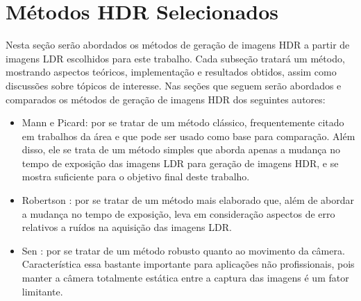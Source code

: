 \section{Métodos HDR Selecionados} \label{metodos}
Nesta seção serão abordados os métodos de geração de imagens HDR a partir de imagens LDR escolhidos para este trabalho. Cada subseção tratará um método, mostrando aspectos teóricos, implementação e resultados obtidos, assim como discussões sobre tópicos de interesse. Nas seções que seguem serão abordados e comparados os métodos de geração de imagens HDR dos seguintes autores:

\begin{itemize}
\item Mann e Picard: por se tratar de um método clássico, frequentemente citado em trabalhos da área e que pode ser usado como base para comparação. Além disso, ele se trata de um método simples que aborda apenas a mudança no tempo de exposição das imagens LDR para geração de imagens HDR, e se mostra suficiente para o objetivo final deste trabalho.
\item Robertson \etal: por se tratar de um método mais elaborado que, além de abordar a mudança no tempo de exposição, leva em consideração aspectos de erro relativos a ruídos na aquisição das imagens LDR. 
\item Sen \etal: por se tratar de um método robusto quanto ao movimento da câmera. Característica essa bastante importante para aplicações não profissionais, pois manter a câmera totalmente estática entre a captura das imagens é um fator limitante.
\end{itemize}

